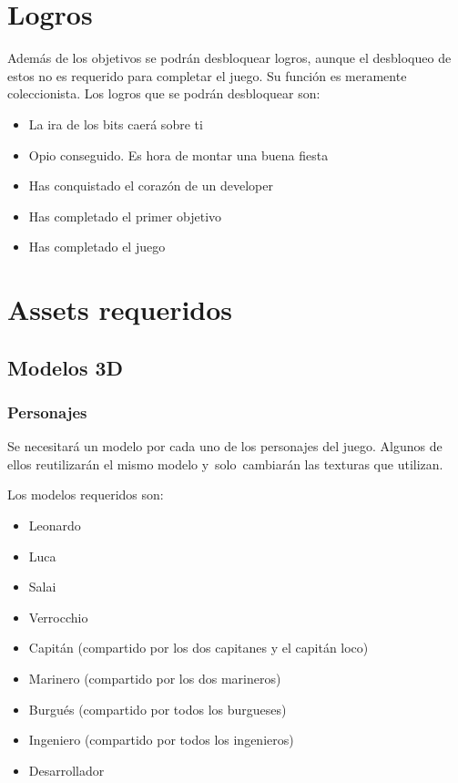 \section[Logros]{ Logros}
\hypertarget{Toc484614266}{}{
Adem\'as de los objetivos se podr\'an desbloquear logros, aunque el desbloqueo de estos no es requerido para completar
el juego. Su funci\'on es meramente coleccionista. Los logros que se podr\'an desbloquear son:}

\liststyleLFOxi
\begin{itemize}
\item {
La ira de los bits caer\'a sobre ti}
\item {
Opio conseguido. Es hora de montar una buena fiesta}
\item {
Has conquistado el coraz\'on de un developer}
\item {
Has completado el primer objetivo}
\item {
Has completado el juego}
\end{itemize}
\section[Assets requeridos]{ Assets requeridos}
\hypertarget{Toc484614267}{}\subsection[Modelos 3D]{ Modelos 3D}
\hypertarget{Toc484614268}{}\subsubsection[Personajes]{ Personajes}
\hypertarget{Toc484614269}{}{
Se necesitar\'a un modelo por cada uno de los personajes del juego. Algunos de ellos reutilizar\'an el mismo modelo
y\ solo\ cambiar\'an las texturas que utilizan.}

{
Los modelos requeridos son:}

\liststyleLFOvi
\begin{itemize}
\item {
Leonardo}
\item {
Luca}
\item {
Salai}
\item {
Verrocchio}
\item {
Capit\'an (compartido por los dos capitanes y el capit\'an loco)}
\item {
Marinero (compartido por los dos marineros)}
\item {
Burgu\'es (compartido por todos los burgueses)}
\item {
Ingeniero (compartido por todos los ingenieros)}
\item {
Desarrollador}
\end{itemize}
